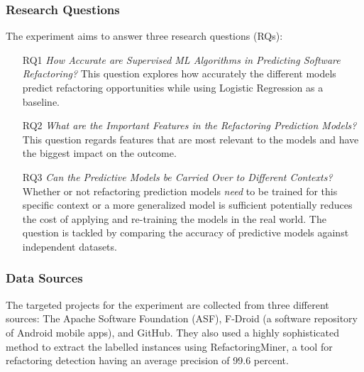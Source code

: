 \subsubsection{Research Questions}
The experiment aims to answer three research questions (RQs): 
\begin{itemize}
    \item[RQ1] \textit{How Accurate are Supervised ML Algorithms in Predicting Software Refactoring?} This question explores how accurately the different models predict refactoring opportunities while using Logistic Regression as a baseline.
    \item[RQ2] \textit{What are the Important Features in the Refactoring Prediction Models?} This question regards features that are most relevant to the models and have the biggest impact on the outcome.
    \item[RQ3] \textit{Can the Predictive Models be Carried Over to Different Contexts?} Whether or not refactoring prediction models \textit{need} to be trained for this specific context or a more generalized model is sufficient potentially reduces the cost of applying and re-training the models in the real world. The question is tackled by comparing the accuracy of predictive models against independent datasets.
\end{itemize}
\subsubsection{Data Sources}
The targeted projects for the experiment are collected from three different sources: The Apache Software Foundation (ASF), F-Droid (a software repository of Android mobile apps), and GitHub. They also used a highly sophisticated method to extract the labelled instances using RefactoringMiner\cite{tsantalis2018accurate}, a tool for refactoring detection having an average precision of 99.6 percent\cite{tsantalis2022refactoringminer}.
